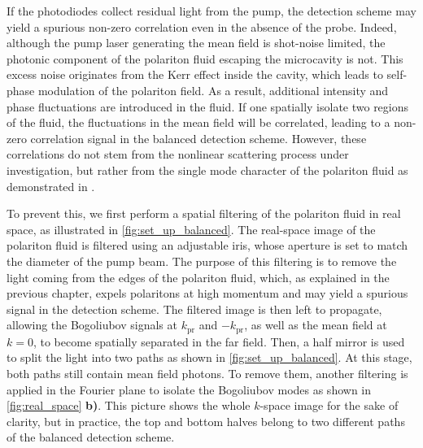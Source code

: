 \indent If the photodiodes collect residual light from the pump, the detection scheme may yield a spurious non-zero correlation even in the absence of the probe. Indeed, although the pump laser generating the mean field is shot-noise limited, the photonic component of the polariton fluid escaping the microcavity is not.
This excess noise originates from the Kerr effect inside the cavity, which leads to self-phase modulation of the polariton field. As a result, additional intensity and phase fluctuations are introduced in the fluid. If one spatially isolate two regions of the fluid, the fluctuations in the mean field will be correlated, leading to a non-zero correlation signal in the balanced detection scheme.
However, these correlations do not stem from the nonlinear scattering process under investigation, but rather from the single mode character of the polariton fluid as demonstrated in \cite{a_baas_quantum_degeneracy2006}.

\bigskip

\indent To prevent this, we first perform a spatial filtering of the polariton fluid in real space, as illustrated in \autoref{fig:set_up_balanced}. The real-space image of the polariton fluid is filtered using an adjustable iris, whose aperture is set to match the diameter of the pump beam.
The purpose of this filtering is to remove the light coming from the edges of the polariton fluid, which, as explained in the previous chapter, expels polaritons at high momentum and may yield a spurious signal in the detection scheme.
The filtered image is then left to propagate, allowing the Bogoliubov signals at $k_{\mathrm{pr}}$ and $-k_{\mathrm{pr}}$, as well as the mean field at $k = 0$, to become spatially separated in the far field.
 Then, a half mirror is used to split the light into two paths as shown in \autoref{fig:set_up_balanced}.
At this stage, both paths still contain mean field photons. To remove them, another filtering is applied in the Fourier plane to isolate the Bogoliubov modes as shown in \autoref{fig:real_space} \textbf{b)}. This picture shows the whole $k$-space image for the sake of clarity, but in practice,
the top and bottom halves belong to two different paths of the balanced detection scheme.


